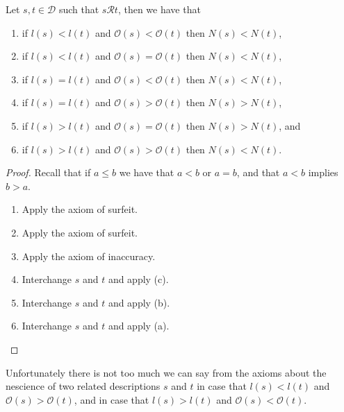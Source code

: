 \begin{proposition}
\label{prop:properties_nescience}
Let $s, t \in \mathcal{D}$ such that $s \mathcal{R} t$, then we have that
\begin{enumerate}[label=(\alph*)]
\item if $l(s) < l(t)$ and $\mathcal{O}(s) < \mathcal{O}(t)$ then $N(s) < N(t)$,
\item if $l(s) < l(t)$ and $\mathcal{O}(s) = \mathcal{O}(t)$ then $N(s) < N(t)$,
\item if $l(s) = l(t)$ and $\mathcal{O}(s) < \mathcal{O}(t)$ then $N(s) < N(t)$,
\item if $l(s) = l(t)$ and $\mathcal{O}(s) > \mathcal{O}(t)$ then $N(s) > N(t)$,
\item if $l(s) > l(t)$ and $\mathcal{O}(s) = \mathcal{O}(t)$ then $N(s) > N(t)$, and
\item if $l(s) > l(t)$ and $\mathcal{O}(s) > \mathcal{O}(t)$ then $N(s) < N(t)$.
\end{enumerate}
\end{proposition}
\begin{proof}

Recall that if $a \le b$ we have that $a < b$ or $a = b$, and that $a < b$ implies $b > a$. 

\begin{enumerate}[label=(\alph*)]

\item Apply the axiom of surfeit.

\item Apply the axiom of surfeit.

\item Apply the axiom of inaccuracy. 

\item Interchange $s$ and $t$ and apply (c).

\item Interchange $s$ and $t$ and apply (b).

\item Interchange $s$ and $t$ and apply (a).

\end{enumerate}

\end{proof}

Unfortunately there is not too much we can say from the axioms about the nescience of two related descriptions $s$ and $t$ in case that $l(s) < l(t)$ and $\mathcal{O} (s) > \mathcal{O} (t)$, and in case that $l(s) > l(t)$ and $\mathcal{O} (s) < \mathcal{O} (t)$. 

